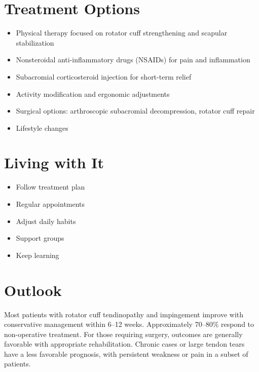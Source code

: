 \section{Treatment Options}
\begin{itemize}[noitemsep]
  \item Physical therapy focused on rotator cuff strengthening and scapular stabilization
  \item Nonsteroidal anti-inflammatory drugs (NSAIDs) for pain and inflammation
  \item Subacromial corticosteroid injection for short-term relief
  \item Activity modification and ergonomic adjustments
  \item Surgical options: arthroscopic subacromial decompression, rotator cuff repair
  \item Lifestyle changes
\end{itemize}

\section{Living with It}
\begin{itemize}[noitemsep]
  \item Follow treatment plan
  \item Regular appointments
  \item Adjust daily habits
  \item Support groups
  \item Keep learning
\end{itemize}

\section{Outlook}
Most patients with rotator cuff tendinopathy and impingement improve with conservative management within 6--12 weeks. Approximately 70--80\% respond to non-operative treatment. For those requiring surgery, outcomes are generally favorable with appropriate rehabilitation. Chronic cases or large tendon tears have a less favorable prognosis, with persistent weakness or pain in a subset of patients.
